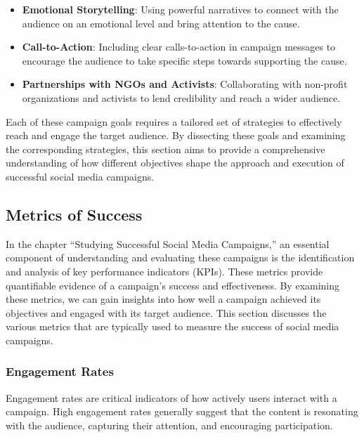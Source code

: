 \documentclass[
]{book}
\providecommand{\tightlist}{%
  \setlength{\itemsep}{0pt}\setlength{\parskip}{0pt}}
\begin{document}
\begin{itemize}
\tightlist
\item
  \textbf{Emotional Storytelling}: Using powerful narratives to connect with the audience on an emotional level and bring attention to the cause.
\item
  \textbf{Call-to-Action}: Including clear calls-to-action in campaign messages to encourage the audience to take specific steps towards supporting the cause.
\item
  \textbf{Partnerships with NGOs and Activists}: Collaborating with non-profit organizations and activists to lend credibility and reach a wider audience.
\end{itemize}

Each of these campaign goals requires a tailored set of strategies to effectively reach and engage the target audience. By dissecting these goals and examining the corresponding strategies, this section aims to provide a comprehensive understanding of how different objectives shape the approach and execution of successful social media campaigns.

\hypertarget{metrics-of-success}{%
\subsection*{Metrics of Success}\label{metrics-of-success}}

In the chapter ``Studying Successful Social Media Campaigns,'' an essential component of understanding and evaluating these campaigns is the identification and analysis of key performance indicators (KPIs). These metrics provide quantifiable evidence of a campaign's success and effectiveness. By examining these metrics, we can gain insights into how well a campaign achieved its objectives and engaged with its target audience. This section discusses the various metrics that are typically used to measure the success of social media campaigns.

\hypertarget{engagement-rates}{%
\subsubsection*{Engagement Rates}\label{engagement-rates}}

Engagement rates are critical indicators of how actively users interact with a campaign. High engagement rates generally suggest that the content is resonating with the audience, capturing their attention, and encouraging participation.
\end{document}
